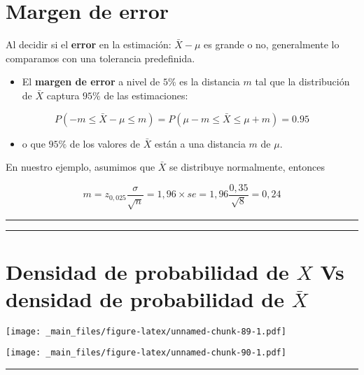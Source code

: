 \documentclass[
]{book}
\providecommand{\tightlist}{%
  \setlength{\itemsep}{0pt}\setlength{\parskip}{0pt}}
\begin{document}
\hypertarget{margen-de-error-2}{%
\section{Margen de error}\label{margen-de-error-2}}

Al decidir si el \textbf{error} en la estimación: \(\bar{X}-\mu\) es grande o no, generalmente lo comparamos con una tolerancia predefinida.

\begin{itemize}
\tightlist
\item
  El \textbf{margen de error} a nivel de \(5\%\) es la distancia \(m\) tal que la distribución de \(\bar{X}\) captura \(95\%\) de las estimaciones:
\end{itemize}

\[P(-m \leq \bar{X}-\mu \leq m)=P(\mu-m \leq \bar{X} \leq\mu + m)=0.95\]

\begin{itemize}
\tightlist
\item
  o que \(95\%\) de los valores de \(\bar{X}\) están a una distancia \(m\) de \(\mu\).
\end{itemize}

En nuestro ejemplo, asumimos que \(\bar{X}\) se distribuye normalmente, entonces

\[m=z_{0,025} \frac{\sigma}{\sqrt{n}}=1,96\times se=1,96\frac{0,35}{\sqrt{8}}=0,24\]

\begin{center}\rule{0.5\linewidth}{0.5pt}\end{center}

\begin{center}\rule{0.5\linewidth}{0.5pt}\end{center}

\hypertarget{densidad-de-probabilidad-de-x-vs-densidad-de-probabilidad-de-barx}{%
\section{\texorpdfstring{Densidad de probabilidad de \(X\) Vs densidad de probabilidad de \(\bar{X}\)}{Densidad de probabilidad de X Vs densidad de probabilidad de \textbackslash bar\{X\}}}\label{densidad-de-probabilidad-de-x-vs-densidad-de-probabilidad-de-barx}}

\texttt{[image: \_main\_files/figure-latex/unnamed-chunk-89-1.pdf]}

\texttt{[image: \_main\_files/figure-latex/unnamed-chunk-90-1.pdf]}

\begin{center}\rule{0.5\linewidth}{0.5pt}\end{center}
\end{document}
